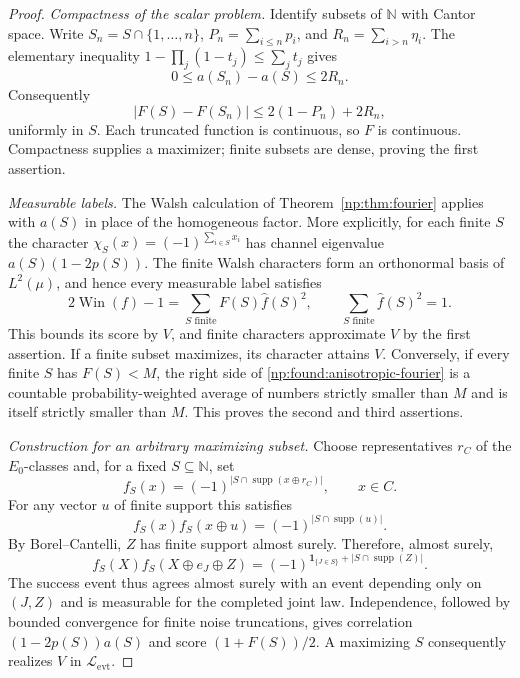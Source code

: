 \documentclass[11pt,a4paper]{article}
\theoremstyle{definition}
\theoremstyle{remark}
\newcommand{\N}{\mathbb N}
\newcommand{\Win}{\operatorname{Win}}
\begin{document}
\begin{proof}
\emph{Compactness of the scalar problem.}
Identify subsets of $\N$ with Cantor space.  Write
$S_n=S\cap\{1,\ldots,n\}$, $P_n=\sum_{i\le n}p_i$, and
$R_n=\sum_{i>n}\eta_i$.  The elementary inequality
$1-\prod_j(1-t_j)\le\sum_jt_j$ gives
\[
 0\le a(S_n)-a(S)\le 2R_n.
\]
Consequently
\begin{equation}
 |F(S)-F(S_n)|\le 2(1-P_n)+2R_n,
 \label{np:found:uniform-truncation}
\end{equation}
uniformly in $S$.  Each truncated function is continuous, so $F$ is
continuous.  Compactness supplies a maximizer; finite subsets are dense,
proving the first assertion.

\emph{Measurable labels.}
The Walsh calculation of Theorem~\ref{np:thm:fourier} applies with
$a(S)$ in place of the homogeneous factor.  More explicitly, for each
finite $S$ the character
$\chi_S(x)=(-1)^{\sum_{i\in S}x_i}$ has channel eigenvalue
$a(S)(1-2p(S))$.  The finite Walsh characters form an orthonormal basis
of $L^2(\mu)$, and hence every measurable label satisfies
\begin{equation}
 2\Win(f)-1
 =\sum_{S\text{ finite}}F(S)\widehat f(S)^2,
 \qquad
 \sum_{S\text{ finite}}\widehat f(S)^2=1.
 \label{np:found:anisotropic-fourier}
\end{equation}
This bounds its score by $V$, and finite characters approximate $V$ by
the first assertion.  If a finite subset maximizes, its character attains
$V$.  Conversely, if every finite $S$ has $F(S)<M$, the right side of
\eqref{np:found:anisotropic-fourier} is a countable probability-weighted
average of numbers strictly smaller than $M$ and is itself strictly
smaller than $M$.  This proves the second and third assertions.

\emph{Construction for an arbitrary maximizing subset.}
Choose representatives $r_C$ of the $E_0$-classes and, for a fixed
$S\subseteq\N$, set
\begin{equation}
 f_S(x)=(-1)^{|S\cap\operatorname{supp}(x\oplus r_C)|},
 \qquad x\in C.
 \label{np:found:generalized-parity}
\end{equation}
For any vector $u$ of finite support this satisfies
\begin{equation}
 f_S(x)f_S(x\oplus u)=(-1)^{|S\cap\operatorname{supp}(u)|}.
 \label{np:found:finite-cocycle}
\end{equation}
By Borel--Cantelli, $Z$ has finite support almost surely.  Therefore,
almost surely,
\[
 f_S(X)f_S(X\oplus e_J\oplus Z)
 =(-1)^{\mathbf1_{\{J\in S\}}+|S\cap\operatorname{supp}(Z)|}.
\]
The success event thus agrees almost surely with an event depending
only on $(J,Z)$ and is measurable for the completed joint law.
Independence, followed by bounded convergence for finite noise
truncations, gives correlation $(1-2p(S))a(S)$ and score
$(1+F(S))/2$.  A maximizing $S$ consequently realizes $V$ in
$\mathcal L_{\mathrm{evt}}$.


\end{proof}
\end{document}
